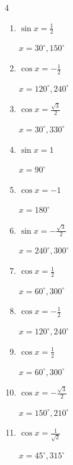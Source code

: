 \begin{multicols}{4}
\begin{enumerate}
        $\displaystyle x = 210^{\circ} , 330^{\circ}$

  \item $\displaystyle \sin{x}  = \frac{1}{2}$

        $\displaystyle x = 30^{\circ} , 150^{\circ}$

  \item $\displaystyle \cos{x}  = -\frac{1}{2}$

        $\displaystyle x = 120^{\circ} , 240^{\circ}$

  \item $\displaystyle \cos{x}  = \frac{\sqrt{3}}{2}$

        $\displaystyle x = 30^{\circ} , 330^{\circ}$

  \item $\displaystyle \sin{x}  = 1$

        $\displaystyle x = 90^{\circ}$

  \item $\displaystyle \cos{x}  = -1$

        $\displaystyle x = 180^{\circ}$

  \item $\displaystyle \sin{x}  = -\frac{\sqrt{3}}{2}$

        $\displaystyle x = 240^{\circ} , 300^{\circ}$

  \item $\displaystyle \cos{x}  = \frac{1}{2}$

        $\displaystyle x = 60^{\circ} , 300^{\circ}$

  \item $\displaystyle \cos{x}  = -\frac{1}{2}$

        $\displaystyle x = 120^{\circ} , 240^{\circ}$

  \item $\displaystyle \cos{x}  = \frac{1}{2}$

        $\displaystyle x = 60^{\circ} , 300^{\circ}$

  \item $\displaystyle \cos{x}  = -\frac{\sqrt{3}}{2}$

        $\displaystyle x = 150^{\circ} , 210^{\circ}$

  \item $\displaystyle \cos{x}  = \frac{1}{\sqrt{2}}$

        $\displaystyle x = 45^{\circ} , 315^{\circ}$

\columnbreak %

\resetques


\end{enumerate}
\end{multicols}
